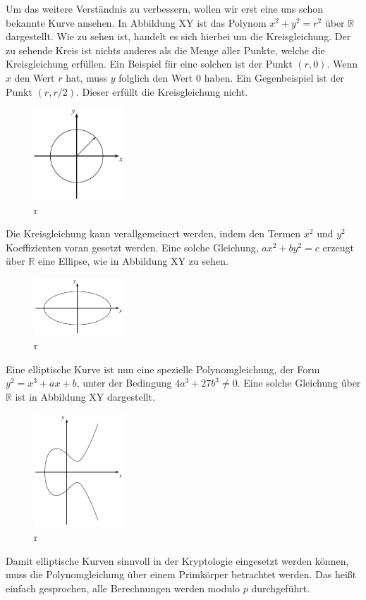 Um das weitere Verständnis zu verbessern, wollen wir erst eine uns schon bekannte Kurve ansehen. In Abbildung XY ist das Polynom $x^2 + y^2 = r^2$ über $\mathbb{R}$ dargestellt. Wie zu sehen ist, handelt es sich hierbei um die Kreisgleichung. Der zu sehende Kreis ist nichts anderes als die Menge aller Punkte, welche die Kreisgleichung erfüllen.
Ein Beispiel für eine solchen ist der Punkt $(r,0)$. Wenn $x$ den Wert $r$ hat, muss $y$ folglich den Wert $0$ haben. Ein Gegenbeispiel ist der Punkt $(r,r/2)$. Dieser erfüllt die Kreisgleichung nicht.
\begin{figure}[!h]
    \centering
    \includegraphics[width=0.3\textwidth]{grafiken/Kreis.PNG}
    \caption[r]{r}
    \label{fig:aufgaben_redesign}
\end{figure}
Die Kreisgleichung kann verallgemeinert werden, indem den Termen $x^2$ und $y^2$ Koeffizienten voran gesetzt werden. Eine solche Gleichung, $ax^2 + by^2 = c$ erzeugt über $\mathbb{R}$ eine Ellipse, wie in Abbildung XY zu sehen.
\begin{figure}[H]
    \centering
    \includegraphics[width=0.3\textwidth]{grafiken/Ellipse.PNG}
    \caption[r]{r}
    \label{fig:aufgaben_redesign}
\end{figure}
Eine elliptische Kurve ist nun eine spezielle Polynomgleichung, der Form $y^2 = x^3 + ax + b$, unter der Bedingung $4a^3 + 27b^3 \neq 0$. Eine solche Gleichung über $\mathbb{R}$ ist in Abbildung XY dargestellt.
\begin{figure}[!h]
    \centering
    \includegraphics[width=0.3\textwidth]{grafiken/Elliptische_Kurve.PNG}
    \caption[r]{r}
    \label{fig:XXXX}
\end{figure}
Damit elliptische Kurven sinnvoll in der Kryptologie eingesetzt werden können, muss die Polynomgleichung über einem Primkörper betrachtet werden. Das heißt einfach gesprochen, alle Berechnungen werden modulo $p$ durchgeführt.
